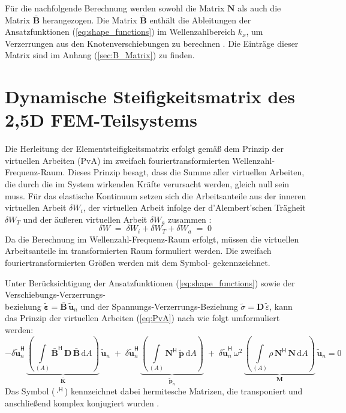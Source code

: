 Für die nachfolgende Berechnung werden sowohl die Matrix \(\mathbf{N}\) als auch die Matrix \(\bar{\mathbf{B}}\) herangezogen. 
Die Matrix $\bar{\mathbf{B}}$ enthält die Ableitungen der Ansatzfunktionen (\ref{eq:shape_functions}) im Wellenzahlbereich $k_x$, um Verzerrungen aus den Knotenverschiebungen zu berechnen \citep{Hackenberg2016}.
Die Einträge dieser Matrix sind im Anhang (\ref{sec:B_Matrix}) zu finden.



\section{Dynamische Steifigkeitsmatrix des 2,5D FEM-Teilsystems}
\label{sec:twofiveD_FEM}

Die Herleitung der Elementsteifigkeitsmatrix erfolgt gemäß dem Prinzip der virtuellen Arbeiten (PvA) im zweifach fouriertransformierten Wellenzahl-Frequenz-Raum. Dieses Prinzip besagt, dass die Summe aller virtuellen Arbeiten, die durch die im System wirkenden Kräfte verursacht werden, gleich null sein muss.
Für das elastische Kontinuum setzen sich die Arbeitsanteile aus der inneren virtuellen Arbeit $\delta W_i$, der virtuellen Arbeit infolge der d'Alembert'schen Trägheit $\delta W_T$ und der äußeren virtuellen Arbeit $\delta W_a$ zusammen \citep{Klein2003}:
\begin{equation}\label{eq:PvA}
	\delta W \;=\; \delta W_i + \delta W_T + \delta W_a \;=\; 0 \,
\end{equation}
Da die Berechnung im Wellenzahl-Frequenz-Raum erfolgt, müssen die virtuellen Arbeitsanteile im transformierten Raum formuliert werden.
Die zweifach fouriertransformierten Größen werden mit dem Symbol $\tilde{}$ gekennzeichnet.

Unter Berücksichtigung der Ansatzfunktionen (\ref{eq:shape_functions}) sowie der Verschiebungs-Verzerrungs-\\beziehung $\tilde{\boldsymbol{\varepsilon}}=\bar{\mathbf B}\,\tilde{\mathbf u}_{n}$ und der Spannungs-Verzerrungs-Beziehung $\tilde{\sigma} = \mathbf D\,\tilde{\varepsilon}$, kann das Prinzip der virtuellen Arbeiten (\ref{eq:PvA}) nach \cite{Freisinger2022} wie folgt umformuliert werden:
\begin{equation}\label{eq:PvA2}
	-\delta \tilde{\mathbf u}_{n}^{\mathsf H}\,
	\underbrace{\left(\int\limits_{(A)} \bar{\mathbf B}^{\mathsf H}\,\mathbf D\,\bar{\mathbf B}\,\mathrm dA\right)}_{\bar{\mathbf{K}}}\,
	\tilde{\mathbf u}_{n}
	\;+\;
	\delta \tilde{\mathbf u}_{n}^{\mathsf H}\,
	\underbrace{\left(\int\limits_{(A)} \mathbf N^{\mathsf H}\,\tilde{\mathbf p}\,\mathrm dA\right)}_{\tilde{\mathbf p}_{n}}
	\;+\;
	\delta \tilde{\mathbf u}_{n}^{\mathsf H}\,\omega^{2}\,
	\underbrace{\left(\int\limits_{(A)} \rho\,\mathbf N^{\mathsf H}\,\mathbf N\,\mathrm dA\right)}_{\mathbf M}\,
	\tilde{\mathbf u}_{n}
	= 0 
\end{equation}
Das Symbol (\(\cdot^{\mathsf H}\)) kennzeichnet dabei hermitesche Matrizen, die transponiert und anschließend komplex konjugiert wurden \citep{Hackenberg2016}.

